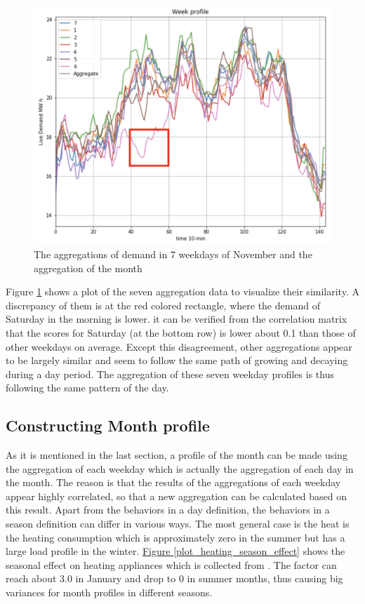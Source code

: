 \documentclass[12pt,a4paper]{report}
\begin{document}
                \begin{figure}[ht]
                    \centerline{\includegraphics[scale=1.4]{weekday_profile}}
                    \caption{The aggregations of demand in 7 weekdays of November and the aggregation of the month}
                    \label{plot_week_profile}
                \end{figure}
                
                Figure \ref{plot_week_profile} shows a plot of the seven aggregation data to visualize their similarity. A discrepancy of them is at the red colored rectangle, where the demand of Saturday in the morning is lower. it can be verified from the correlation matrix that the scores for Saturday (at the bottom row) is lower about 0.1 than those of other weekdays on average. Except this disagreement, other aggregations appear to be largely similar and seem to follow the same path of growing and decaying during a day period. The aggregation of these seven weekday profiles is thus following the same pattern of the day.

                \subsection{Constructing Month profile}

                As it is mentioned in the last section, a profile of the month can be made using the aggregation of each weekday which is actually the aggregation of each day in the month. The reason is that the results of the aggregations of each weekday appear highly correlated, so that a new aggregation can be calculated based on this result. Apart from the behaviors in a day definition, the behaviors in a season definition can differ in various ways. The most general case is the heat is the heating consumption which is approximately zero in the summer but has a large load profile in the winter. \hyperref[plot_heating_season_effect]{Figure \ref*{plot_heating_season_effect}} shows the seasonal effect on heating appliances which is collected from \cite{report:household}. The factor can reach about 3.0 in January and drop to 0 in summer months, thus causing big variances for month profiles in different seasons.
\end{document}

